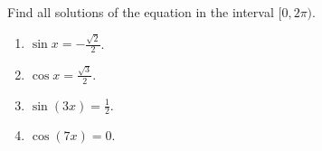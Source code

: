 Find all solutions of the equation in the interval $[0,2\pi)$.

\begin{enumerate}[ref={\fcProblemRef}]
\item $\sin x = -\frac{\sqrt{2}}{2}$.

\item $\cos x = \frac{\sqrt{3}}{2}$.

\item $\sin (3x) = \frac{1}{2}$.

\item $\cos (7x) = 0$.

\end{enumerate}